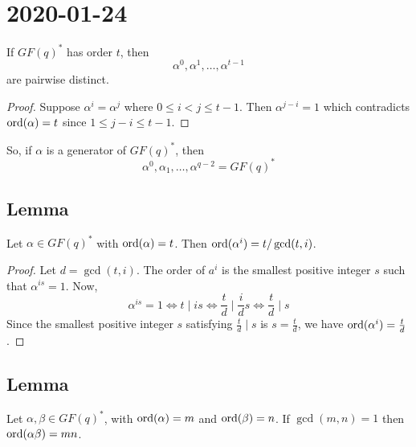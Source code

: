 \section{2020-01-24}
\begin{thmbox}
    \begin{theorem}
    If $ GF(q)^* $ has order $ t $, then
    \[ \alpha^0,\alpha^1,\ldots,\alpha^{t-1} \]
    are pairwise distinct.
\end{theorem} \end{thmbox}

\begin{proof}
    Suppose $ \alpha^i=\alpha^j $ where $ 0\leqslant i<j\leqslant t-1 $.
    Then $ \alpha^{j-i}=1 $ which contradicts $ \operatorname{ord}(\alpha)=t $
    since $ 1\leqslant j-i\leqslant t-1 $.
\end{proof}

So, if $ \alpha $ is a generator of $ GF(q)^* $, then
\[ \alpha^0,\alpha_1,\ldots ,\alpha^{q-2}=GF(q)^* \]

\begin{thmbox}
    \begin{theorem}
    \subsection{Lemma}
    Let $ \alpha\in GF(q)^* $ with $ \operatorname{ord}(\alpha)=t $. Then $ \operatorname{ord}(\alpha^i)=
    t/\gcd(t,i) $.
\end{theorem} \end{thmbox}

\begin{proof}
    Let $ d=\gcd(t,i) $. The order of $ a^i $ is the smallest positive
    integer $ s $ such that $ \alpha^{is}=1 $. Now,
    \[ \alpha^{is}=1\iff t\mid is\iff \frac{t}{d}\mid \frac{i}{d}s
    \iff \frac{t}{d} \mid s \]
    Since the smallest positive integer $ s $ satisfying $ \frac{t}{d} \mid s $
    is $ s=\frac{t}{d} $, we have $ \operatorname{ord}(\alpha^i)=\frac{t}{d} $.
\end{proof}

\begin{thmbox}
    \begin{theorem}
    \subsection{Lemma}
    Let $ \alpha,\beta\in GF(q)^* $, with $ \operatorname{ord}(\alpha)=m $ and $ \operatorname{ord}(\beta)=n $.
    If $ \gcd(m,n)=1 $ then $ \operatorname{ord}(\alpha\beta)=mn $.
\end{theorem} \end{thmbox}

